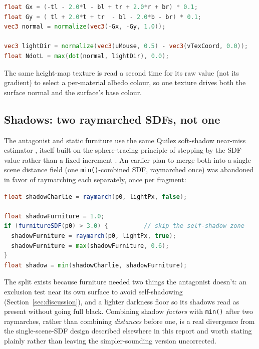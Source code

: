 \documentclass[conference]{IEEEtran}
\begin{document}
\begin{lstlisting}[language=GLSL,caption={Sobel-derived normal, then Lambertian diffuse against a moving point light.},label={lst:sobel}]
float Gx = (-tl - 2.0*l - bl + tr + 2.0*r + br) * 0.1;
float Gy = ( tl + 2.0*t + tr  - bl - 2.0*b - br) * 0.1;
vec3 normal = normalize(vec3(-Gx, -Gy, 1.0));

vec3 lightDir = normalize(vec3(uMouse, 0.5) - vec3(vTexCoord, 0.0));
float NdotL = max(dot(normal, lightDir), 0.0);
\end{lstlisting}

The same height-map texture is read a second time for its raw value (not its gradient) to select a per-material albedo colour, so one texture drives both the surface normal and the surface's base colour.

\subsection{Shadows: two raymarched SDFs, not one}
The antagonist and static furniture use the same Quilez soft-shadow near-miss estimator \cite{quilez2010softshadows}, itself built on the sphere-tracing principle of stepping by the SDF value rather than a fixed increment \cite{hart1996spheretracing}. An earlier plan to merge both into a single scene distance field (one \texttt{min()}-combined SDF, raymarched once) was abandoned in favor of raymarching each separately, once per fragment:

\begin{lstlisting}[language=GLSL,caption={Two independent raymarches, combined by taking the minimum of the resulting shadow factors, not by merging the distance fields themselves.},label={lst:raymarch}]
float shadowCharlie = raymarch(p0, lightPx, false);

float shadowFurniture = 1.0;
if (furnitureSDF(p0) > 3.0) {          // skip the self-shadow zone
  shadowFurniture = raymarch(p0, lightPx, true);
  shadowFurniture = max(shadowFurniture, 0.6);
}
float shadow = min(shadowCharlie, shadowFurniture);
\end{lstlisting}

The split exists because furniture needed two things the antagonist doesn't: an exclusion test near its own surface to avoid self-shadowing (Section~\ref{sec:discussion}), and a lighter darkness floor so its shadows read as present without going full black. Combining shadow \emph{factors} with \texttt{min()} after two raymarches, rather than combining \emph{distances} before one, is a real divergence from the single-scene-SDF design described elsewhere in this report and worth stating plainly rather than leaving the simpler-sounding version uncorrected.
\end{document}
